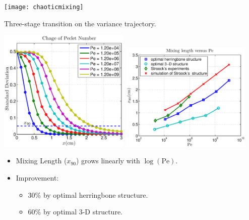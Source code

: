 \documentclass[12pt,t]{beamer}
\begin{document}
\begin{frame}
    \begin{center}
      \texttt{[image: chaoticmixing]}
    \end{center}
Three-stage transition on the variance trajectory.

\end{frame}
\begin{frame}
    \begin{center}
       \includegraphics[width=0.47\textwidth]{example2veryPe2}
       \includegraphics[width=0.47\textwidth]{example2mixinglength2}
    \end{center}
  \begin{itemize}
    \item Mixing Length ($x_{90}$) grows linearly with $\log(\text{Pe})$.
    \item Improvement: 
        \begin{itemize}
        \item 30\% by optimal herringbone structure. 
        \item 60\% by optimal $3$-D structure.
        \end{itemize}
  \end{itemize}
\end{frame}
\end{document}

